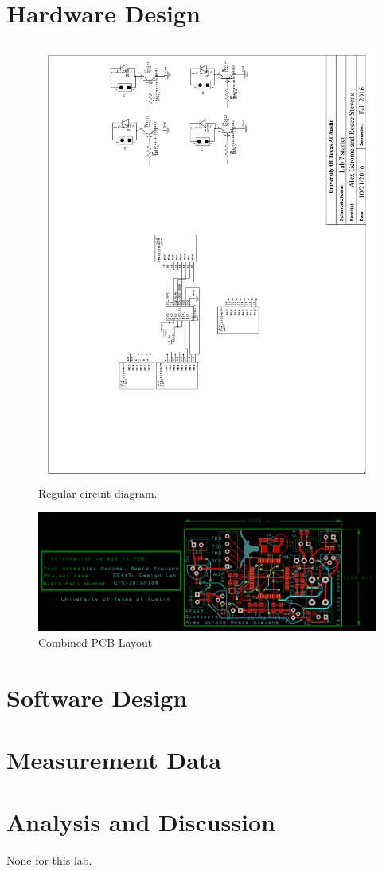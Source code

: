 \documentclass{article}
\begin{document}
\section{Hardware Design}
\begin{figure}[H]
	\includegraphics[width=\textwidth]{./CircuitSchematic}
    \caption{Regular circuit diagram.}
\end{figure}

\begin{figure}[H]
	\includegraphics[width=\textwidth]{./PCB_both}
    \caption{Combined PCB Layout}
\end{figure}

\section{Software Design}

\section{Measurement Data}

\section{Analysis and Discussion}
None for this lab.
\end{document}
